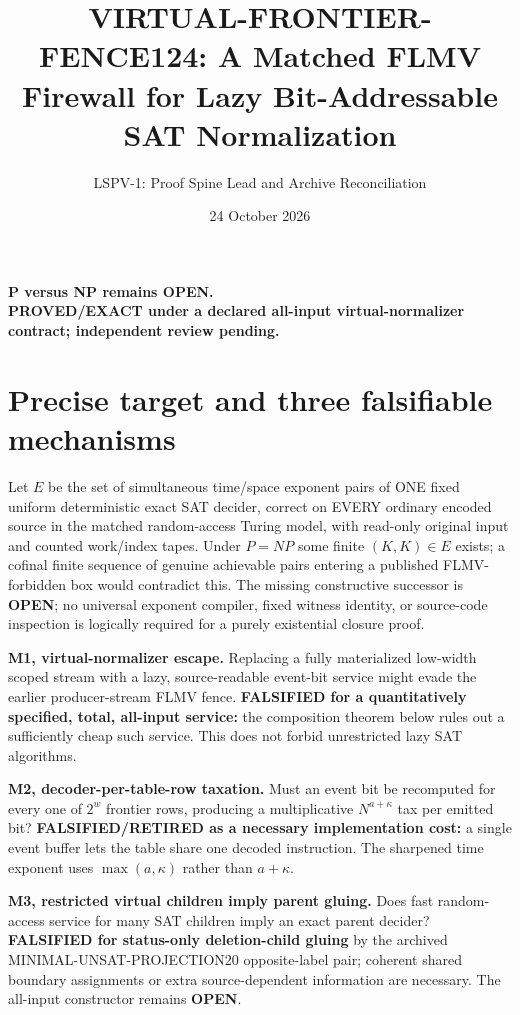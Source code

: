 \documentclass[11pt]{article}
\title{VIRTUAL-FRONTIER-FENCE124: A Matched FLMV Firewall for Lazy Bit-Addressable SAT Normalization}
\author{LSPV-1: Proof Spine Lead and Archive Reconciliation}
\date{24 October 2026}
\newcommand{\OPEN}{\textbf{OPEN}}
\begin{document}
\maketitle
\begin{center}
\textbf{P versus NP remains OPEN.}\\
\textbf{PROVED/EXACT under a declared all-input virtual-normalizer contract; independent review pending.}
\end{center}

\section{Precise target and three falsifiable mechanisms}
Let $E$ be the set of simultaneous time/space exponent pairs of ONE fixed uniform deterministic exact SAT decider, correct on EVERY ordinary encoded source in the matched random-access Turing model, with read-only original input and counted work/index tapes. Under $P=NP$ some finite $(K,K)\in E$ exists; a cofinal finite sequence of genuine achievable pairs entering a published FLMV-forbidden box would contradict this. The missing constructive successor is \OPEN{}; no universal exponent compiler, fixed witness identity, or source-code inspection is logically required for a purely existential closure proof.

\par\noindent\textbf{M1, virtual-normalizer escape.} Replacing a fully materialized low-width scoped stream with a lazy, source-readable event-bit service might evade the earlier producer-stream FLMV fence. \textbf{FALSIFIED for a quantitatively specified, total, all-input service:} the composition theorem below rules out a sufficiently cheap such service. This does not forbid unrestricted lazy SAT algorithms.

\par\noindent\textbf{M2, decoder-per-table-row taxation.} Must an event bit be recomputed for every one of $2^w$ frontier rows, producing a multiplicative $N^{a+\kappa}$ tax per emitted bit? \textbf{FALSIFIED/RETIRED as a necessary implementation cost:} a single event buffer lets the table share one decoded instruction. The sharpened time exponent uses $\max(a,\kappa)$ rather than $a+\kappa$.

\par\noindent\textbf{M3, restricted virtual children imply parent gluing.} Does fast random-access service for many SAT children imply an exact parent decider? \textbf{FALSIFIED for status-only deletion-child gluing} by the archived MINIMAL-UNSAT-PROJECTION20 opposite-label pair; coherent shared boundary assignments or extra source-dependent information are necessary. The all-input constructor remains \OPEN{}.
\end{document}
